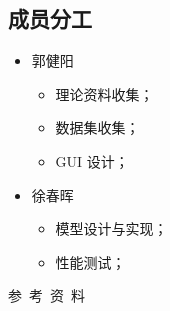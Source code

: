\documentclass[10.5pt,compsoc,UTF8]{CjC}
\theoremstyle{mystyle}
\begin{document}
\begin{multicols}{2}

\section{\heiti 成员分工}
\begin{itemize}
    \item 郭健阳
        \begin{itemize}
            \item 理论资料收集；
            \item 数据集收集；
            \item GUI 设计；
        \end{itemize}
    \item 徐春晖
        \begin{itemize}
            \item 模型设计与实现；
            \item 性能测试；
        \end{itemize}
\end{itemize}


\vspace {10mm}

\centerline
{\textsf{参~考~资~料}}
 \addtolength{\itemsep}{-1em}
\vspace {1.5mm}




\nocite{*}

\end{multicols}
\end{document}
